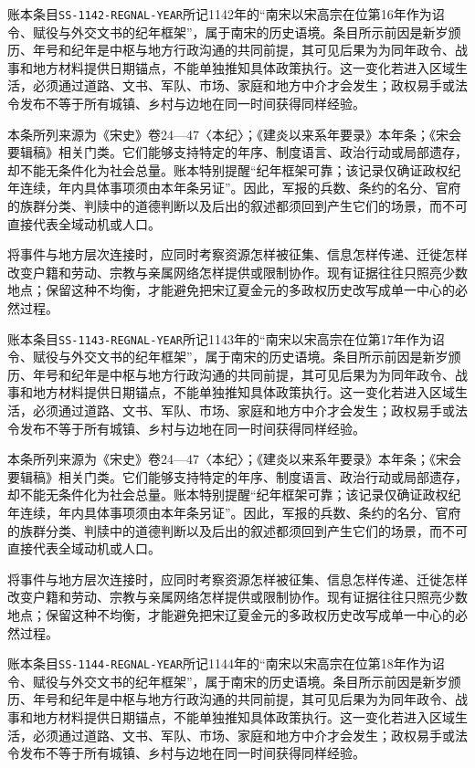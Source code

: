 账本条目\texttt{SS-1142-REGNAL-YEAR}所记1142年的“南宋以宋高宗在位第16年作为诏令、赋役与外交文书的纪年框架”，属于南宋的历史语境。条目所示前因是新岁颁历、年号和纪年是中枢与地方行政沟通的共同前提，其可见后果为为同年政令、战事和地方材料提供日期锚点，不能单独推知具体政策执行。这一变化若进入区域生活，必须通过道路、文书、军队、市场、家庭和地方中介才会发生；政权易手或法令发布不等于所有城镇、乡村与边地在同一时间获得同样经验。

本条所列来源为《宋史》卷24—47〈本纪〉；《建炎以来系年要录》本年条；《宋会要辑稿》相关门类。它们能够支持特定的年序、制度语言、政治行动或局部遗存，却不能无条件化为社会总量。账本特别提醒“纪年框架可靠；该记录仅确证政权纪年连续，年内具体事项须由本年条另证”。因此，军报的兵数、条约的名分、官府的族群分类、判牍中的道德判断以及后出的叙述都须回到产生它们的场景，而不可直接代表全域动机或人口。

将事件与地方层次连接时，应同时考察资源怎样被征集、信息怎样传递、迁徙怎样改变户籍和劳动、宗教与亲属网络怎样提供或限制协作。现有证据往往只照亮少数地点；保留这种不均衡，才能避免把宋辽夏金元的多政权历史改写成单一中心的必然过程。

账本条目\texttt{SS-1143-REGNAL-YEAR}所记1143年的“南宋以宋高宗在位第17年作为诏令、赋役与外交文书的纪年框架”，属于南宋的历史语境。条目所示前因是新岁颁历、年号和纪年是中枢与地方行政沟通的共同前提，其可见后果为为同年政令、战事和地方材料提供日期锚点，不能单独推知具体政策执行。这一变化若进入区域生活，必须通过道路、文书、军队、市场、家庭和地方中介才会发生；政权易手或法令发布不等于所有城镇、乡村与边地在同一时间获得同样经验。

本条所列来源为《宋史》卷24—47〈本纪〉；《建炎以来系年要录》本年条；《宋会要辑稿》相关门类。它们能够支持特定的年序、制度语言、政治行动或局部遗存，却不能无条件化为社会总量。账本特别提醒“纪年框架可靠；该记录仅确证政权纪年连续，年内具体事项须由本年条另证”。因此，军报的兵数、条约的名分、官府的族群分类、判牍中的道德判断以及后出的叙述都须回到产生它们的场景，而不可直接代表全域动机或人口。

将事件与地方层次连接时，应同时考察资源怎样被征集、信息怎样传递、迁徙怎样改变户籍和劳动、宗教与亲属网络怎样提供或限制协作。现有证据往往只照亮少数地点；保留这种不均衡，才能避免把宋辽夏金元的多政权历史改写成单一中心的必然过程。

账本条目\texttt{SS-1144-REGNAL-YEAR}所记1144年的“南宋以宋高宗在位第18年作为诏令、赋役与外交文书的纪年框架”，属于南宋的历史语境。条目所示前因是新岁颁历、年号和纪年是中枢与地方行政沟通的共同前提，其可见后果为为同年政令、战事和地方材料提供日期锚点，不能单独推知具体政策执行。这一变化若进入区域生活，必须通过道路、文书、军队、市场、家庭和地方中介才会发生；政权易手或法令发布不等于所有城镇、乡村与边地在同一时间获得同样经验。

